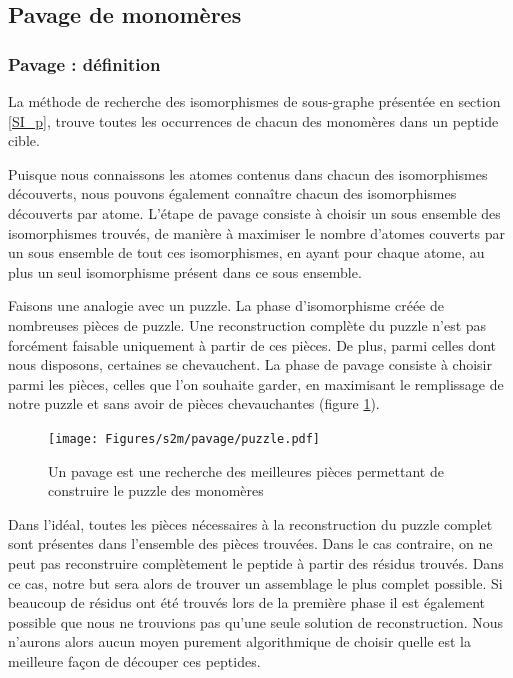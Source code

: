 \subsection{Pavage de monomères}

\subsubsection{Pavage : définition}

La méthode de recherche des isomorphismes de sous-graphe présentée en section \ref{SI_p}, trouve toutes les occurrences de chacun des monomères dans un peptide cible.

Puisque nous connaissons les atomes contenus dans chacun des isomorphismes découverts, nous pouvons également connaître chacun des isomorphismes découverts par atome.
L'étape de pavage consiste à choisir un sous ensemble des isomorphismes trouvés, de manière à maximiser le nombre d'atomes couverts par un sous ensemble de tout ces isomorphismes, en ayant pour chaque atome, au plus un seul isomorphisme présent dans ce sous ensemble.

Faisons une analogie avec un puzzle. La phase d'isomorphisme créée de nombreuses pièces de puzzle.
Une reconstruction complète du puzzle n'est pas forcément faisable uniquement à partir de ces pièces.
De plus, parmi celles dont nous disposons, certaines se chevauchent.
La phase de pavage consiste à choisir parmi les pièces, celles que l'on souhaite garder, en maximisant le remplissage de notre puzzle et sans avoir de pièces chevauchantes (figure \ref{puzzle}).

\begin{figure}
  \texttt{[image: Figures/s2m/pavage/puzzle.pdf]}
  \caption{\label{puzzle}Un pavage est une recherche des meilleures pièces permettant de construire le puzzle des monomères}
\end{figure}

Dans l'idéal, toutes les pièces nécessaires à la reconstruction du puzzle complet sont présentes dans l'ensemble des
pièces trouvées. Dans le cas contraire, on ne peut pas reconstruire complètement le peptide à partir des résidus trouvés. 
Dans ce cas, notre
but sera alors de trouver un assemblage le plus complet possible. Si beaucoup de résidus ont été trouvés lors de la première phase
il est également possible que nous ne trouvions pas qu'une seule solution de reconstruction. Nous n'aurons alors aucun moyen
purement algorithmique de choisir quelle est la meilleure façon de découper ces peptides.

